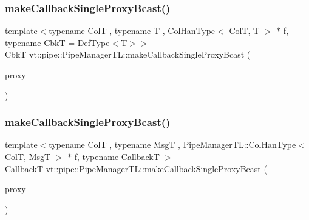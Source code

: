 \mbox{\label{structvt_1_1pipe_1_1_pipe_manager_t_l_a0f66ce82b544151cbdec67a13a6ead34}} 
\subsubsection{\texorpdfstring{make\+Callback\+Single\+Proxy\+Bcast()}{makeCallbackSingleProxyBcast()}\hspace{0.1cm}{\footnotesize\ttfamily [1/2]}}
{\footnotesize\ttfamily template$<$typename ColT , typename T , Col\+Han\+Type$<$ Col\+T, T $>$ $\ast$ f, typename CbkT  = Def\+Type$<$\+T$>$$>$ \\
CbkT vt\+::pipe\+::\+Pipe\+Manager\+T\+L\+::make\+Callback\+Single\+Proxy\+Bcast (\begin{DoxyParamCaption}\item[{\hyperlink{structvt_1_1pipe_1_1_pipe_manager_t_l_af56c58cad882496e35f01227d4da3898}{Col\+Proxy\+Type}$<$ ColT $>$}]{proxy }\end{DoxyParamCaption})}

\mbox{\label{structvt_1_1pipe_1_1_pipe_manager_t_l_aff5140772699150c68dc912017e3a670}} 
\subsubsection{\texorpdfstring{make\+Callback\+Single\+Proxy\+Bcast()}{makeCallbackSingleProxyBcast()}\hspace{0.1cm}{\footnotesize\ttfamily [2/2]}}
{\footnotesize\ttfamily template$<$typename ColT , typename MsgT , Pipe\+Manager\+T\+L\+::\+Col\+Han\+Type$<$ Col\+T, Msg\+T $>$ $\ast$ f, typename CallbackT $>$ \\
CallbackT vt\+::pipe\+::\+Pipe\+Manager\+T\+L\+::make\+Callback\+Single\+Proxy\+Bcast (\begin{DoxyParamCaption}\item[{\hyperlink{structvt_1_1pipe_1_1_pipe_manager_t_l_af56c58cad882496e35f01227d4da3898}{Col\+Proxy\+Type}$<$ ColT $>$}]{proxy }\end{DoxyParamCaption})}

